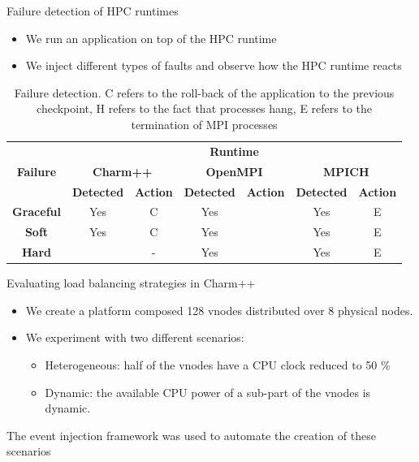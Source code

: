 \documentclass[11pt,xcolor=dvipsnames,presentation]{beamer}
\begin{document}
\begin{frame}[label=sec-4-0-9]{Failure detection of HPC runtimes}
\begin{itemize}
\item We run an application on top of the HPC runtime
\item We inject different types of faults and observe how the HPC runtime reacts
\end{itemize}


\begin{table}[ht!]
  { \scriptsize
  \begin{tabular}{|c|c|c|c|c|c|c|}
  \hline
  \multirow{3}{*}{\textbf{Failure}} &
  \multicolumn{6}{c|}{\textbf{Runtime}}  \\
  \cline{1-7}
  &\multicolumn{2}{c}{\textbf{Charm++}}&
  \multicolumn{2}{|c}{\textbf{OpenMPI}}&
  \multicolumn{2}{|c|}{\textbf{MPICH}}\\
  \cline{2-7}
  &\textbf{Detected} & \textbf{Action} & \textbf{Detected} & \textbf{Action} & \textbf{Detected} & \textbf{Action}  \\
  \hline
  \textbf{Graceful}  &   Yes  & C   &  Yes   &  \color{red}{H}  &  Yes   &  E   \\
  \textbf{Soft}  &       Yes  & C   &  Yes   &  \color{red}{H}  &  Yes   &  E   \\
  \textbf{Hard}   &      \color{red}{No}   & -   &  Yes   &  \color{red}{H}  &  Yes   &  E   \\
  \hline
  \end{tabular}
  }
  \caption{Failure detection. C refers to the roll-back of the application to the previous checkpoint,
  H refers to the fact that processes hang, E refers to the termination of MPI processes}
  \label{table:assess_HPC_runtimes}
\end{table}
\end{frame}

\begin{frame}[label=sec-4-0-10]{Evaluating load balancing strategies in Charm++}
\begin{itemize}
\item We create a platform composed 128 vnodes distributed over 8 physical nodes.

\item We experiment with two different scenarios:

\begin{itemize}
\item \alert{Heterogeneous}: half of the vnodes have a CPU clock reduced to 50 \%

\item \alert{Dynamic}: the available CPU power of a sub-part of the vnodes is dynamic.
\end{itemize}
\end{itemize}


The event injection framework was used to automate the creation of these scenarios
\end{frame}
\end{document}
